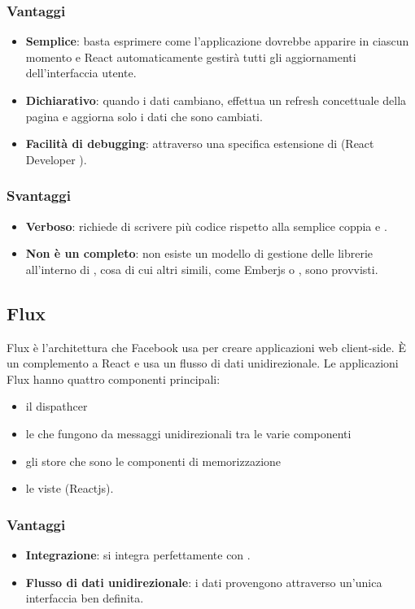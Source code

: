 \subsubsection{Vantaggi}
\begin{itemize}
\item \textbf{Semplice}: basta esprimere come l'applicazione dovrebbe apparire in ciascun momento e React automaticamente gestir\`a tutti gli aggiornamenti dell'interfaccia utente.
\item \textbf{Dichiarativo}: quando i dati cambiano,  effettua un refresh concettuale della pagina e aggiorna solo i dati che sono cambiati.
\item \textbf{Facilit\`a di debugging}: attraverso una specifica estensione di  (React Developer ).
\end{itemize}
\subsubsection{Svantaggi}
\begin{itemize}
\item \textbf{Verboso}: richiede di scrivere pi\`u codice rispetto alla semplice coppia  e .
\item \textbf{Non \`e un  completo}: non esiste un modello di gestione delle librerie all'interno di , cosa di cui altri  simili, come Emberjs o , sono provvisti.
\end{itemize}
\subsection{Flux}
Flux è l'architettura che Facebook usa per creare applicazioni web client-side. È un complemento a React e usa un flusso di dati unidirezionale. Le applicazioni Flux hanno quattro componenti principali: 
\begin{itemize}
\item il dispathcer 
\item le  che fungono da messaggi unidirezionali tra le varie componenti
\item gli store che sono le componenti di memorizzazione
\item le viste (Reactjs).
\end{itemize}
\subsubsection{Vantaggi}
\begin{itemize}
\item \textbf{Integrazione}: si integra perfettamente con .
\item \textbf{Flusso di dati unidirezionale}: i dati provengono attraverso un'unica interfaccia ben definita.
\end{itemize}
